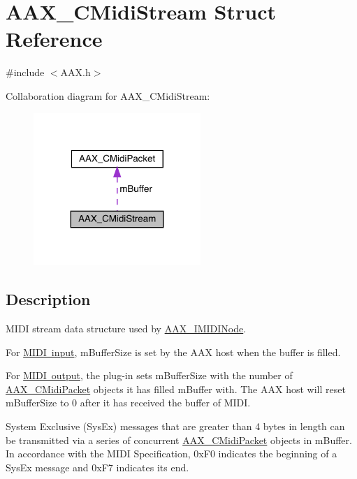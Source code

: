 \hypertarget{a01433}{}\section{A\+A\+X\+\_\+\+C\+Midi\+Stream Struct Reference}
\label{a01433}


{\ttfamily \#include $<$A\+A\+X.\+h$>$}



Collaboration diagram for A\+A\+X\+\_\+\+C\+Midi\+Stream\+:
\nopagebreak
\begin{figure}[H]
\begin{center}
\leavevmode
\includegraphics[width=179pt]{a01431}
\end{center}
\end{figure}


\subsection{Description}
M\+I\+DI stream data structure used by \mbox{\hyperlink{a01845}{A\+A\+X\+\_\+\+I\+M\+I\+D\+I\+Node}}. 

For \mbox{\hyperlink{a00491_a5e1dffce35d05990dbbad651702678e4ae57de2b04978fe2e75f5bdeb034bda44}{M\+I\+DI input}}, m\+Buffer\+Size is set by the A\+AX host when the buffer is filled.

For \mbox{\hyperlink{a00491_a5e1dffce35d05990dbbad651702678e4acc1b5f2109c508b20a65b5e0fdcd643f}{M\+I\+DI output}}, the plug-\/in sets m\+Buffer\+Size with the number of \mbox{\hyperlink{a01429}{A\+A\+X\+\_\+\+C\+Midi\+Packet}} objects it has filled m\+Buffer with. The A\+AX host will reset m\+Buffer\+Size to 0 after it has received the buffer of M\+I\+DI.

System Exclusive (Sys\+Ex) messages that are greater than 4 bytes in length can be transmitted via a series of concurrent \mbox{\hyperlink{a01429}{A\+A\+X\+\_\+\+C\+Midi\+Packet}} objects in m\+Buffer. In accordance with the M\+I\+DI Specification, {\ttfamily 0x\+F0} indicates the beginning of a Sys\+Ex message and {\ttfamily 0x\+F7} indicates its end.


